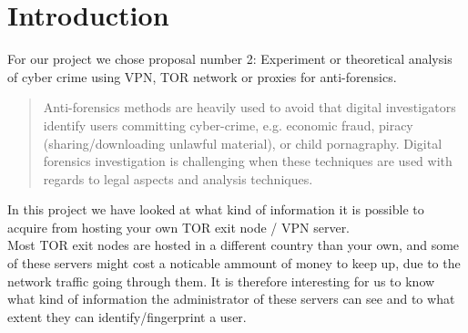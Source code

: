 \section{Introduction}
For our project we chose proposal number 2: Experiment or theoretical analysis of cyber crime using VPN, TOR network or proxies for anti-forensics.

\begin{quote}
Anti-forensics methods are heavily used to avoid that digital investigators identify users committing cyber-crime, e.g. economic fraud, piracy (sharing/downloading unlawful material), or child pornagraphy. Digital forensics investigation is challenging when these techniques are used with regards to legal aspects and analysis techniques.
\end{quote}

In this project we have looked at what kind of information it is possible to acquire from hosting your own TOR exit node / VPN server. \\

Most TOR exit nodes are hosted in a different country than your own, and some of these servers might cost a noticable ammount of money to keep up, due to the network traffic going through them. It is therefore interesting for us to know what kind of information the administrator of these servers can see and to what extent they can identify/fingerprint a user.


